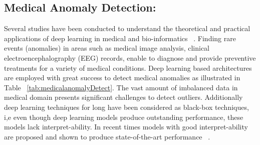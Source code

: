 \subsection{Medical Anomaly Detection:}
\label{sec:medical_anomaly_detection}

 Several studies have been conducted to understand the theoretical and practical applications of deep learning in medical and bio-informatics ~\cite{min2017deep,cao2018deep,zhao2016deep,khan2018review}. Finding rare events (anomalies) in areas such as medical image analysis, clinical electroencephalography (EEG) records,  enable to diagnose and provide preventive treatments for a variety of medical conditions. Deep learning based architectures are employed with great success to detect medical anomalies as illustrated in Table ~\ref{tab:medicalanomalyDetect}. The vast amount of imbalanced data in medical domain presents significant challenges to detect  outliers. Additionally deep learning techniques for long have been considered as black-box techniques, i,e even though deep learning models produce outstanding performance, these models lack interpret-ability. In recent times models with good interpret-ability are proposed and shown to produce state-of-the-art performance ~\cite{gugulothusparse,amarasinghe2018toward,choi2018doctor}.

